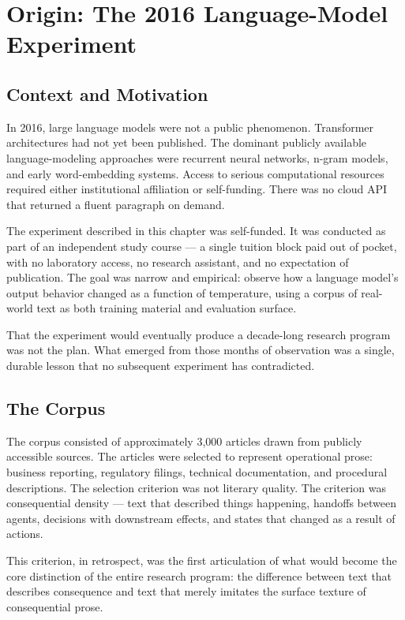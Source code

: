 \chapter{Origin: The 2016 Language-Model Experiment}
\label{chap:origin}

\section{Context and Motivation}

In 2016, large language models were not a public phenomenon. Transformer architectures had not yet been published. The dominant publicly available language-modeling approaches were recurrent neural networks, n-gram models, and early word-embedding systems. Access to serious computational resources required either institutional affiliation or self-funding. There was no cloud API that returned a fluent paragraph on demand.

The experiment described in this chapter was self-funded. It was conducted as part of an independent study course --- a single tuition block paid out of pocket, with no laboratory access, no research assistant, and no expectation of publication. The goal was narrow and empirical: observe how a language model's output behavior changed as a function of temperature, using a corpus of real-world text as both training material and evaluation surface.

That the experiment would eventually produce a decade-long research program was not the plan. What emerged from those months of observation was a single, durable lesson that no subsequent experiment has contradicted.

\section{The Corpus}

The corpus consisted of approximately 3,000 articles drawn from publicly accessible sources. The articles were selected to represent operational prose: business reporting, regulatory filings, technical documentation, and procedural descriptions. The selection criterion was not literary quality. The criterion was consequential density --- text that described things happening, handoffs between agents, decisions with downstream effects, and states that changed as a result of actions.

This criterion, in retrospect, was the first articulation of what would become the core distinction of the entire research program: the difference between text that describes consequence and text that merely imitates the surface texture of consequential prose.

